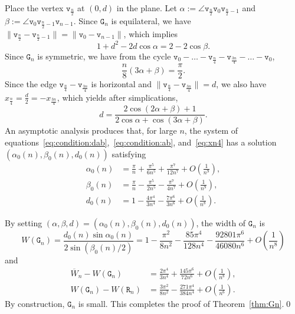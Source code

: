 \documentclass[a4paper,12pt]{article}
\theoremstyle{definition}
\theoremstyle{plain}
\newcommand{\ub}[1]{\overline{#1}}
\newcommand{\geo}[1]{\mathtt{#1}}
\begin{document}
Place the vertex $\geo{v}_{\frac{n}{2}}$ at $(0,d)$ in the plane. Let $\alpha := \angle \geo{v}_{\frac{n}{2}} \geo{v}_0 \geo{v}_{\frac{n}{2}-1}$ and $\beta := \angle \geo{v}_0 \geo{v}_{\frac{n}{2}-1} \geo{v}_{n-1}$. Since $\geo{G}_n$ is equilateral, we have $\|\geo{v}_{\frac{n}{2}}-\geo{v}_{\frac{n}{2}-1}\| = \|\geo{v}_0-\geo{v}_{n-1}\|$, which implies
\begin{equation}\label{eq:condition:dab}
	1 + d^2 - 2d\cos \alpha = 2 - 2 \cos \beta.
\end{equation}
Since $\geo{G}_n$ is symmetric, we have from the cycle $\geo{v}_0 - \ldots - \geo{v}_{\frac{n}{4}} - \geo{v}_{\frac{3n}{4}} - \ldots - \geo{v}_{0}$,
\begin{equation}\label{eq:condition:ab}
\frac{n}{8}(3\alpha + \beta) = \frac{\pi}{2}.
\end{equation}
Since the edge $\geo{v}_{\frac{n}{4}} - \geo{v}_{\frac{3n}{4}}$ is horizontal and $\|\geo{v}_{\frac{n}{4}} - \geo{v}_{\frac{3n}{4}}\| = d$, we also have $x_{\frac{n}{4}} = \frac{d}{2} = - x_{\frac{3n}{4}}$, which yields after simplications,
\begin{equation}\label{eq:xn4}
	d = \frac{2\cos(2\alpha + \beta)+1}{2\cos \alpha + \cos(3\alpha + \beta)}.
\end{equation}
An asymptotic analysis produces that, for large $n$, the system of equations~\eqref{eq:condition:dab},~\eqref{eq:condition:ab}, and~\eqref{eq:xn4} has a solution $(\alpha_0(n),\beta_0(n),d_0(n))$ satisfying
\[
\begin{aligned}
	\alpha_0(n) &=  \frac{\pi}{n} + \frac{\pi^5}{6n^5} + \frac{\pi^7}{12n^7} + O\left(\frac{1}{n^9}\right),\\
	\beta_0(n) &=  \frac{\pi}{n} - \frac{\pi^5}{2n^5} - \frac{\pi^7}{4n^7} + O\left(\frac{1}{n^9}\right),\\
	d_0(n) &=  1 - \frac{4\pi^4}{3n^4} - \frac{7\pi^6}{3n^6} + O\left(\frac{1}{n^8}\right).
\end{aligned}
\]

By setting $(\alpha,\beta,d) = (\alpha_0(n),\beta_0(n),d_0(n))$, the width of $\geo{G}_n$ is
\[
	W(\geo{G}_n) = \frac{d_0(n)\sin \alpha_0(n)}{2\sin (\beta_0(n)/2)} = 1 - \frac{\pi^2}{8n^2} - \frac{85\pi^4}{128n^4} - \frac{92801\pi^6}{46080n^6} + O\left(\frac{1}{n^8}\right)
\]
and
\[
\begin{aligned}
	\ub{W}_n - W(\geo{G}_n) &= \frac{2\pi^4}{3n^4} + \frac{145\pi^6}{72n^6} + O\left(\frac{1}{n^8}\right),\\
	W(\geo{G}_n) - W(\geo{R}_n) &= \frac{3\pi^2}{8n^2} - \frac{271\pi^4}{384n^4} + O\left(\frac{1}{n^6}\right).
\end{aligned}
\]
By construction, $\geo{G}_n$ is small. This completes the proof of Theorem~\ref{thm:Gn}.\qed
\end{document}
